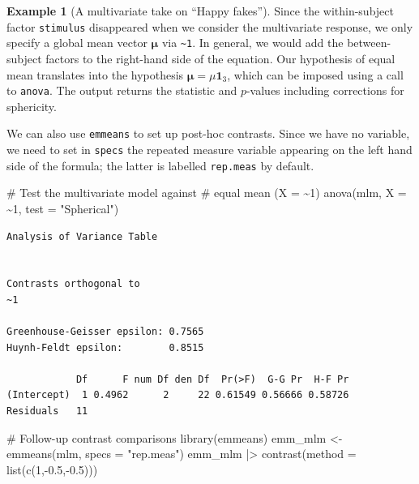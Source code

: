 \documentclass[
  11pt,
  letterpaper,
]{scrbook}
\newenvironment{Shaded}{\begin{snugshade}}{\end{snugshade}}
\newcommand{\AttributeTok}[1]{\textcolor[rgb]{0.40,0.45,0.13}{#1}}
\newcommand{\CommentTok}[1]{\textcolor[rgb]{0.37,0.37,0.37}{#1}}
\newcommand{\DecValTok}[1]{\textcolor[rgb]{0.68,0.00,0.00}{#1}}
\newcommand{\FloatTok}[1]{\textcolor[rgb]{0.68,0.00,0.00}{#1}}
\newcommand{\FunctionTok}[1]{\textcolor[rgb]{0.28,0.35,0.67}{#1}}
\newcommand{\NormalTok}[1]{\textcolor[rgb]{0.00,0.23,0.31}{#1}}
\newcommand{\OtherTok}[1]{\textcolor[rgb]{0.00,0.23,0.31}{#1}}
\newcommand{\SpecialCharTok}[1]{\textcolor[rgb]{0.37,0.37,0.37}{#1}}
\newcommand{\StringTok}[1]{\textcolor[rgb]{0.13,0.47,0.30}{#1}}
\theoremstyle{definition}
\newtheorem{example}{Example}[chapter]
\theoremstyle{definition}
\theoremstyle{remark}
\begin{document}
\begin{example}[A multivariate take on ``Happy
fakes'']
Since the within-subject factor \texttt{stimulus} disappeared when we
consider the multivariate response, we only specify a global mean vector
\(\boldsymbol{\mu}\) via \texttt{\textasciitilde{}1}. In general, we
would add the between-subject factors to the right-hand side of the
equation. Our hypothesis of equal mean translates into the hypothesis
\(\boldsymbol{\mu} = \mu\boldsymbol{1}_3\), which can be imposed using a
call to \texttt{anova}. The output returns the statistic and
\(p\)-values including corrections for sphericity.

We can also use \texttt{emmeans} to set up post-hoc contrasts. Since we
have no variable, we need to set in \texttt{specs} the repeated measure
variable appearing on the left hand side of the formula; the latter is
labelled \texttt{rep.meas} by default.

\begin{Shaded}
\begin{Highlighting}[]
\CommentTok{\# Test the multivariate model against}
\CommentTok{\# equal mean (X = \textasciitilde{}1)}
\FunctionTok{anova}\NormalTok{(mlm, }\AttributeTok{X =} \SpecialCharTok{\textasciitilde{}}\DecValTok{1}\NormalTok{, }\AttributeTok{test =} \StringTok{"Spherical"}\NormalTok{)}
\end{Highlighting}
\end{Shaded}

\begin{verbatim}
Analysis of Variance Table


Contrasts orthogonal to
~1

Greenhouse-Geisser epsilon: 0.7565
Huynh-Feldt epsilon:        0.8515

            Df      F num Df den Df  Pr(>F)  G-G Pr  H-F Pr
(Intercept)  1 0.4962      2     22 0.61549 0.56666 0.58726
Residuals   11                                             
\end{verbatim}

\begin{Shaded}
\begin{Highlighting}[]
\CommentTok{\# Follow{-}up contrast comparisons}
\FunctionTok{library}\NormalTok{(emmeans)}
\NormalTok{emm\_mlm }\OtherTok{\textless{}{-}} \FunctionTok{emmeans}\NormalTok{(mlm, }\AttributeTok{specs =} \StringTok{"rep.meas"}\NormalTok{) }
\NormalTok{emm\_mlm }\SpecialCharTok{|\textgreater{}} \FunctionTok{contrast}\NormalTok{(}\AttributeTok{method =} \FunctionTok{list}\NormalTok{(}\FunctionTok{c}\NormalTok{(}\DecValTok{1}\NormalTok{,}\SpecialCharTok{{-}}\FloatTok{0.5}\NormalTok{,}\SpecialCharTok{{-}}\FloatTok{0.5}\NormalTok{)))}
\end{Highlighting}
\end{Shaded}


\end{example}
\end{document}
